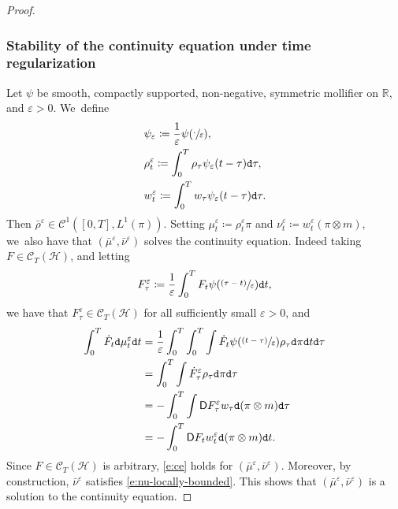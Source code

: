 \documentclass[JEP,XML,SOM,Unicode,published]{cedram}
\newcommand{\psfrac}[2]{\sfrac{(#1)}{#2}}
\theoremstyle{definition}
\theoremstyle{remark}
\DeclarePairedDelimiter{\paren}{\lparen}{\rparen}
\begin{document}
\begin{proof}
\subsubsection*{Stability of the continuity equation under time regularization}
Let $\psi$ be smooth, compactly supported, non-negative, symmetric mollifier on $\mathbb{R}$, and $\varepsilon > 0$. We~define
\begin{align*}
& \psi_{\varepsilon} \coloneq \frac{1}{\varepsilon} \psi\paren*{\sfrac{\cdot}{\varepsilon}}, \\
& \rho^{\varepsilon}_{t} \coloneq \int_{0}^{T} \rho_{\tau} \psi_{\varepsilon}(t-\tau) \mathtt{d} \tau, \\
& w^{\varepsilon}_{t} \coloneq \int_{0}^{T} w_{\tau} \psi_{\varepsilon}(t-\tau) \mathtt{d} \tau.
\end{align*}
Then $\bar{\rho}^{\varepsilon} \in \mathscr{C}^{1}([0,T], L^{1}(\pi))$.
Setting $\mu^{\varepsilon}_{t} \coloneq \rho^{\varepsilon}_{t} \pi$ and $\nu^{\varepsilon}_{t} \coloneq w^{\varepsilon}_{t} (\pi \otimes m)$, we~also have that $(\bar{\mu}^{\varepsilon}, \bar{\nu}^{\varepsilon})$ solves the continuity equation.
Indeed taking $F \in \mathscr{C}_{T}(\mathscr{H})$, and letting
\begin{equation*}
F_{\tau}^{\varepsilon} \coloneq \frac{1}{\varepsilon} \int_{0}^{T} F_{t} \psi\paren*{\psfrac{\tau - t}{\varepsilon}} \mathtt{d} t,
\end{equation*}
we have that $F^{\varepsilon}_{\tau} \in \mathscr{C}_{T}(\mathscr{H})$ for all sufficiently small $\varepsilon > 0$, and
\begin{align*}
\int_{0}^{T} \dot{F}_{t} \mathtt{d} \mu^{\varepsilon}_{t} \mathtt{d} t &= \frac{1}{\varepsilon} \int_{0}^{T} \int_{0}^{T} \int \dot{F}_{t} \psi\paren*{\psfrac{t-\tau}{\varepsilon}} \rho_{\tau} \mathtt{d} \pi \mathtt{d} t \mathtt{d} \tau \\
&= \int_{0}^{T} \int \dot{F}_{\tau}^{\varepsilon} \rho_{\tau} \mathtt{d} \pi \mathtt{d} \tau \\
&= - \int_{0}^{T} \int \mathsf{D} F^{\varepsilon}_{\tau} w_{\tau} \mathtt{d}(\pi \otimes m) \mathtt{d} \tau \\
&= - \int_{0}^{T} \mathsf{D} F_{t} w^{\varepsilon}_{t} \mathtt{d}(\pi \otimes m) \mathtt{d} t.
\end{align*}
Since $F \in \mathscr{C}_{T}(\mathscr{H})$ is arbitrary, \cref{e:ce} holds for $(\bar{\mu}^{\varepsilon}, \bar{\nu}^{\varepsilon})$.
Moreover, by construction, $\bar{\nu}^{\varepsilon}$ satisfies \cref{e:nu-locally-bounded}.
This shows that $(\bar{\mu}^{\varepsilon}, \bar{\nu}^{\varepsilon})$ is a solution to the continuity equation.


\end{proof}
\end{document}
